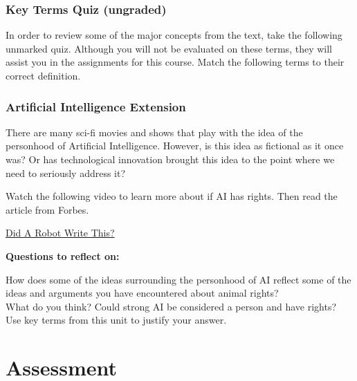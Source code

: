 \documentclass[
]{book}
\begin{document}
\begin{reflect}
\hypertarget{key-terms-quiz-ungraded-5}{%
\subsubsection*{Key Terms Quiz (ungraded)}\label{key-terms-quiz-ungraded-5}}

In order to review some of the major concepts from the text, take the following unmarked quiz. Although you will not be evaluated on these terms, they will assist you in the assignments for this course.
Match the following terms to their correct definition.

\hypertarget{artificial-intelligence-extension}{%
\subsubsection*{Artificial Intelligence Extension}\label{artificial-intelligence-extension}}

There are many sci-fi movies and shows that play with the idea of the personhood of Artificial Intelligence. However, is this idea as fictional as it once was? Or has technological innovation brought this idea to the point where we need to seriously address it?

Watch the following video to learn more about if AI has rights. Then read the article from Forbes.

\href{https://www.forbes.com/sites/nicolemartin1/2019/02/08/did-a-robot-write-this-how-ai-is-impacting-journalism/\#6d4b9c347795}{Did A Robot Write This?}
\end{reflect}

\begin{caution}
\textbf{Questions to reflect on: }

How does some of the ideas surrounding the personhood of AI reflect some of the ideas and arguments you have encountered about animal rights?\\
What do you think? Could strong AI be considered a person and have rights? Use key terms from this unit to justify your answer.
\end{caution}

\hypertarget{assessment-6}{%
\section*{Assessment}\label{assessment-6}}
\end{document}
